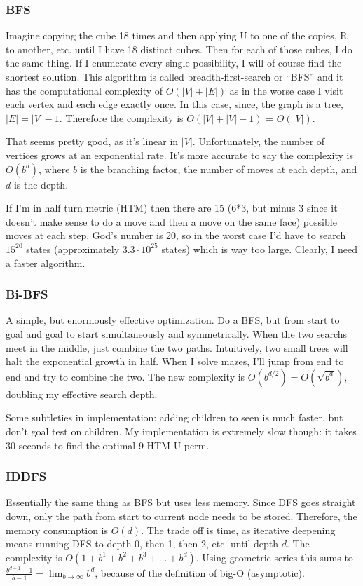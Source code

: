 \documentclass[11pt, oneside]{article}
\begin{document}
\subsubsection{BFS}
Imagine copying the cube 18 times and then applying U to one of the copies,
R to another, etc. until I have 18 distinct cubes. Then for each of those cubes, I do the same thing.
If I enumerate every single possibility, I will of course find the shortest solution.
This algorithm is called breadth-first-search or ``BFS'' and it has the computational complexity of \( O(|V| + |E|)\)
as in the worse case I visit each vertex and each edge exactly once.
In this case, since, the graph is a tree, \( |E| = |V| - 1\). Therefore the complexity is \( O(|V| + |V| - 1)\) = \( O(|V|) \).

That seems pretty good, as it's linear in \( |V| \).
Unfortunately, the number of vertices grows at an exponential rate. It's more accurate to say the complexity is \( O(b^d) \),
where \( b \) is the branching factor, the number of moves at each depth, and \( d \) is the depth.

If I'm in half turn metric (HTM) then there are 15 (6*3, but minus 3 since it doesn't make sense to do a move and then a move on the same face)
possible moves at each step. God's number is 20, so in the worst case I'd have to search \( 15^{20} \) states (approximately \(3.3 \cdot 10^{25} \) states)
which is way too large. Clearly, I need a faster algorithm.

\subsubsection{Bi-BFS}
A simple, but enormously effective optimization. Do a BFS, but from start to goal and goal to start simultaneously and symmetrically.
When the two searchs meet in the middle, just combine the two paths. Intuitively, two small trees will halt
the exponential growth in half. When I solve mazes, I'll jump from end to end and try to combine the two.
The new complexity is \( O(b^{d/2}) = O(\sqrt{b^d}) \), doubling my effective search depth.

Some subtleties in implementation: adding children to seen is much faster, but don't goal test on children.
My implementation is extremely slow though: it takes 30 seconds to find the optimal 9 HTM U-perm.

\subsubsection{IDDFS}
Essentially the same thing as BFS but uses less memory. Since DFS goes straight down, only the path from start to current node needs to be stored.
Therefore, the memory consumption is \( O(d) \). The trade off is time, as iterative deepening means running DFS to depth 0, then 1, then 2, etc.
until depth \( d \). The complexity is \( O(1 + b^1 + b^2 + b^3 + ... + b^d) \).
Using geometric series this sums to \( \frac{b^{d + 1} - 1}{b - 1} = \lim_{b \to \infty} b^d\), because of the definition of big-O (asymptotic).
\end{document}
